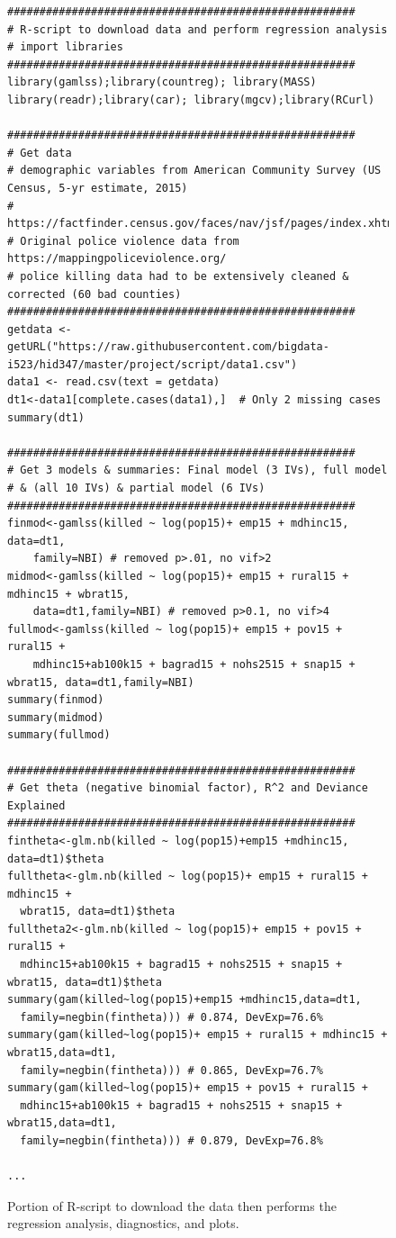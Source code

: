 \documentclass[sigconf]{acmart}
\begin{document}
\begin{figure}[htb]
\begin{verbatim}
######################################################
# R-script to download data and perform regression analysis 
# import libraries
######################################################
library(gamlss);library(countreg); library(MASS)
library(readr);library(car); library(mgcv);library(RCurl)

######################################################
# Get data
# demographic variables from American Community Survey (US Census, 5-yr estimate, 2015)
#  https://factfinder.census.gov/faces/nav/jsf/pages/index.xhtml
# Original police violence data from https://mappingpoliceviolence.org/
# police killing data had to be extensively cleaned & corrected (60 bad counties)
######################################################
getdata <- getURL("https://raw.githubusercontent.com/bigdata-i523/hid347/master/project/script/data1.csv")
data1 <- read.csv(text = getdata)
dt1<-data1[complete.cases(data1),]  # Only 2 missing cases
summary(dt1)

######################################################
# Get 3 models & summaries: Final model (3 IVs), full model 
# & (all 10 IVs) & partial model (6 IVs)
######################################################
finmod<-gamlss(killed ~ log(pop15)+ emp15 + mdhinc15, data=dt1,
    family=NBI) # removed p>.01, no vif>2
midmod<-gamlss(killed ~ log(pop15)+ emp15 + rural15 + mdhinc15 + wbrat15, 
    data=dt1,family=NBI) # removed p>0.1, no vif>4
fullmod<-gamlss(killed ~ log(pop15)+ emp15 + pov15 + rural15 + 
    mdhinc15+ab100k15 + bagrad15 + nohs2515 + snap15 + wbrat15, data=dt1,family=NBI)
summary(finmod)
summary(midmod)
summary(fullmod)

######################################################
# Get theta (negative binomial factor), R^2 and Deviance Explained 
######################################################
fintheta<-glm.nb(killed ~ log(pop15)+emp15 +mdhinc15, data=dt1)$theta
fulltheta<-glm.nb(killed ~ log(pop15)+ emp15 + rural15 + mdhinc15 + 
  wbrat15, data=dt1)$theta
fulltheta2<-glm.nb(killed ~ log(pop15)+ emp15 + pov15 + rural15 + 
  mdhinc15+ab100k15 + bagrad15 + nohs2515 + snap15 + wbrat15, data=dt1)$theta
summary(gam(killed~log(pop15)+emp15 +mdhinc15,data=dt1,
  family=negbin(fintheta))) # 0.874, DevExp=76.6%
summary(gam(killed~log(pop15)+ emp15 + rural15 + mdhinc15 + wbrat15,data=dt1,
  family=negbin(fintheta))) # 0.865, DevExp=76.7%
summary(gam(killed~log(pop15)+ emp15 + pov15 + rural15 + 
  mdhinc15+ab100k15 + bagrad15 + nohs2515 + snap15 + wbrat15,data=dt1,
  family=negbin(fintheta))) # 0.879, DevExp=76.8%

...

\end{verbatim}
\caption{Portion of R-script to download the data then performs the regression analysis, diagnostics, and plots. }\label{townsleyR}
\end{figure}
\end{document}

